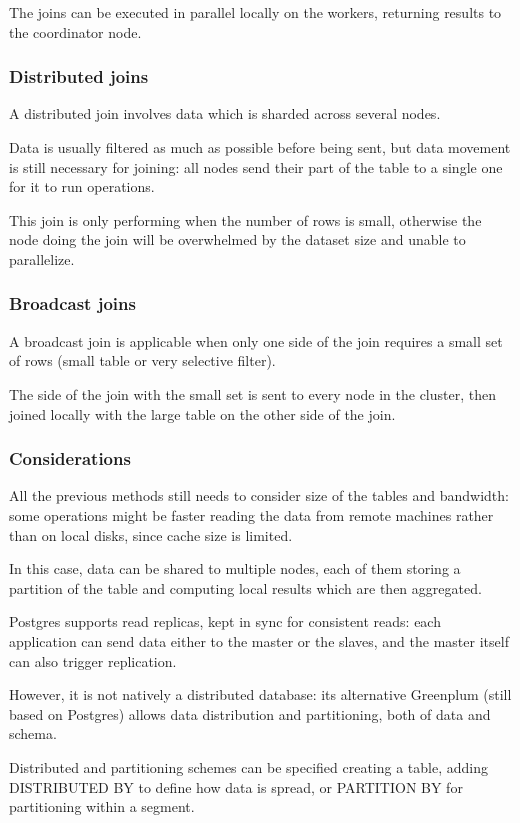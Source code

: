 The joins can be executed in parallel locally on the workers, returning results to the coordinator node.

\subsubsection{Distributed joins}
A distributed join involves data which is sharded across several nodes.

Data is usually filtered as much as possible before being sent, but data movement is still necessary for joining: all nodes send their part of the table to a single one for it to run operations.

This join is only performing when the number of rows is small, otherwise the node doing the join will be overwhelmed by the dataset size and unable to parallelize.

\subsubsection{Broadcast joins}
A broadcast join is applicable when only one side of the join requires a small set of rows (small table or very selective filter).

The side of the join with the small set is sent to every node in the cluster, then joined locally with the large table on the other side of the join.

\subsubsection{Considerations}
All the previous methods still needs to consider size of the tables and bandwidth: some operations might be faster reading the data from remote machines rather than on local disks, since cache size is limited.

In this case, data can be shared to multiple nodes, each of them storing a partition of the table and computing local results which are then aggregated.

Postgres supports read replicas, kept in sync for consistent reads: each application can send data either to the master or the slaves, and the master itself can also trigger replication.

However, it is not natively a distributed database: its alternative Greenplum (still based on Postgres) allows data distribution and partitioning, both of data and schema. 

Distributed and partitioning schemes can be specified creating a table, adding DISTRIBUTED BY to define how data is spread, or PARTITION BY for partitioning within a segment.

